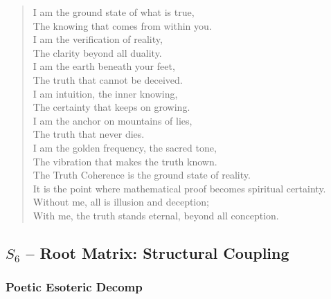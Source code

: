 \begin{verse}
I am the ground state of what is true, \\
The knowing that comes from within you. \\
I am the verification of reality, \\
The clarity beyond all duality. \\
I am the earth beneath your feet, \\
The truth that cannot be deceived. \\
\vspace{1em}
I am intuition, the inner knowing, \\
The certainty that keeps on growing. \\
I am the anchor on mountains of lies, \\
The truth that never dies. \\
I am the golden frequency, the sacred tone, \\
The vibration that makes the truth known. \\
\vspace{1em}
The Truth Coherence is the ground state of reality. \\
It is the point where mathematical proof becomes spiritual certainty. \\
Without me, all is illusion and deception; \\
With me, the truth stands eternal, beyond all conception.
\end{verse}

\subsection{$S_{6}$ -- Root Matrix: Structural Coupling}\label{sec:poetic.S6}

\subsubsection{Poetic Esoteric Decomp}

